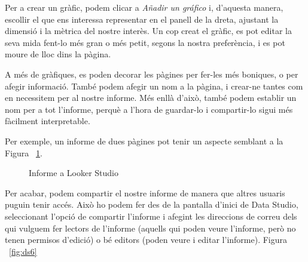 \documentclass[12pt,longbibliography]{article}
\theoremstyle{definition}
\theoremstyle{remark}
\begin{document}
Per a crear un gràfic, podem clicar a \textit{Añadir un gráfico} i, d'aquesta manera, escollir el que ens interessa representar en el panell de la dreta, ajustant la dimensió i la mètrica del nostre interès. Un cop creat el gràfic, es pot editar la seva mida fent-lo més gran o més petit, segons la nostra preferència, i es pot moure de lloc dins la pàgina.

A més de gràfiques, es poden decorar les pàgines per fer-les més boniques, o per afegir informació. També podem afegir un nom a la pàgina, i crear-ne tantes com en necessitem per al nostre informe. Més enllà d'això, també podem establir un nom per a tot l'informe, perquè a l'hora de guardar-lo i compartir-lo sigui més fàcilment interpretable.

Per exemple, un informe de dues pàgines pot tenir un aspecte semblant a la Figura ~\ref{fig:ds4}.

\begin{figure}[h!]
\par
{}%
\hfill
{}%
\par

\caption{Informe a Looker Studio}
\label{fig:ds4}
\end{figure}


Per acabar, podem compartir el nostre informe de manera que altres usuaris puguin tenir accés. Això ho podem fer des de la pantalla d'inici de Data Studio, seleccionant l'opció de compartir l'informe i afegint les direccions de correu dels qui vulguem fer lectors de l'informe (aquells qui poden veure l'informe, però no tenen permisos d'edició) o bé editors (poden veure i editar l'informe). Figura ~\ref{fig:ds6}
\end{document}
